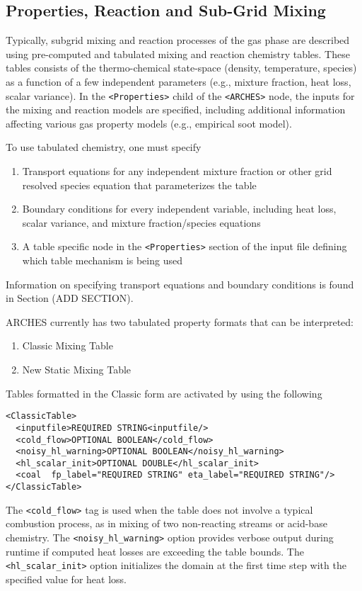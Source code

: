
\subsection{Properties, Reaction and Sub-Grid Mixing}
% 
Typically, subgrid mixing and reaction processes of the gas phase are described using pre-computed and tabulated mixing and reaction chemistry tables.  These tables consists of the thermo-chemical state-space (density, temperature, species) as a function of a few independent parameters (e.g., mixture fraction, heat loss, scalar variance).  In the \verb=<Properties>= child of the \verb=<ARCHES>= node, the inputs for the mixing and reaction models are specified, including additional information affecting various gas property models (e.g., empirical soot model).  

To use tabulated chemistry, one must specify
\begin{enumerate}
\item Transport equations for any independent mixture fraction or other grid resolved species equation that parameterizes the table
\item Boundary conditions for every independent variable, including heat loss, scalar variance, and mixture fraction/species equations
\item A table specific node in the \verb=<Properties>= section of the input file defining which table mechanism is being used 
\end{enumerate}
Information on specifying transport equations and boundary conditions is found in Section (ADD SECTION).    

ARCHES currently has two tabulated property formats that can be interpreted: 
\begin{enumerate} 
\item Classic Mixing Table 
\item New Static Mixing Table 
\end{enumerate} 

Tables formatted in the Classic form are activated by using the following 
%
\begin{Verbatim}[fontsize=\footnotesize]
<ClassicTable>
  <inputfile>REQUIRED STRING<inputfile/> 
  <cold_flow>OPTIONAL BOOLEAN</cold_flow> 
  <noisy_hl_warning>OPTIONAL BOOLEAN</noisy_hl_warning>  
  <hl_scalar_init>OPTIONAL DOUBLE</hl_scalar_init> 
  <coal  fp_label="REQUIRED STRING" eta_label="REQUIRED STRING"/> 
</ClassicTable>
\end{Verbatim} 
%
The \verb=<cold_flow>= tag is used when the table does not involve a typical combustion process, as in mixing of two non-reacting streams or acid-base chemistry.  The \verb=<noisy_hl_warning>= option provides verbose output during runtime if computed heat losses are exceeding the table bounds.  The \verb=<hl_scalar_init>= option initializes the domain at the first time step with the specified value for heat loss.  


